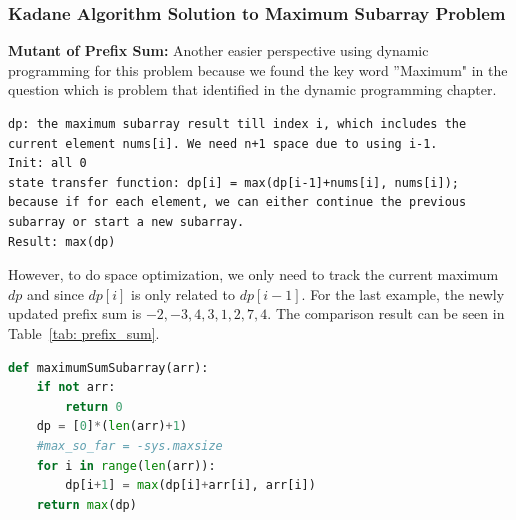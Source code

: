 \documentclass[../specific-algorithms.tex]{subfiles}
\begin{document}
\subsubsection{Kadane Algorithm Solution to Maximum Subarray Problem}
\textbf{Mutant of Prefix Sum:} Another easier perspective using dynamic programming for this problem because we found the key word ''Maximum" in the question which is problem that identified in the dynamic programming chapter. 
\begin{lstlisting}
dp: the maximum subarray result till index i, which includes the current element nums[i]. We need n+1 space due to using i-1.
Init: all 0
state transfer function: dp[i] = max(dp[i-1]+nums[i], nums[i]); because if for each element, we can either continue the previous subarray or start a new subarray. 
Result: max(dp)
\end{lstlisting}
However, to do space optimization, we only need to track the current maximum $dp$ and since $dp[i]$ is only related to $dp[i-1]$. For the last example, the newly updated prefix sum is $-2, -3, 4, 3, 1, 2, 7, 4$. The comparison result can be seen in Table~\ref{tab: prefix_sum}. 
\begin{lstlisting}[language=Python]
def maximumSumSubarray(arr): 
    if not arr:
        return 0
    dp = [0]*(len(arr)+1)
    #max_so_far = -sys.maxsize
    for i in range(len(arr)):
        dp[i+1] = max(dp[i]+arr[i], arr[i])
    return max(dp)
\end{lstlisting}
\end{document}
